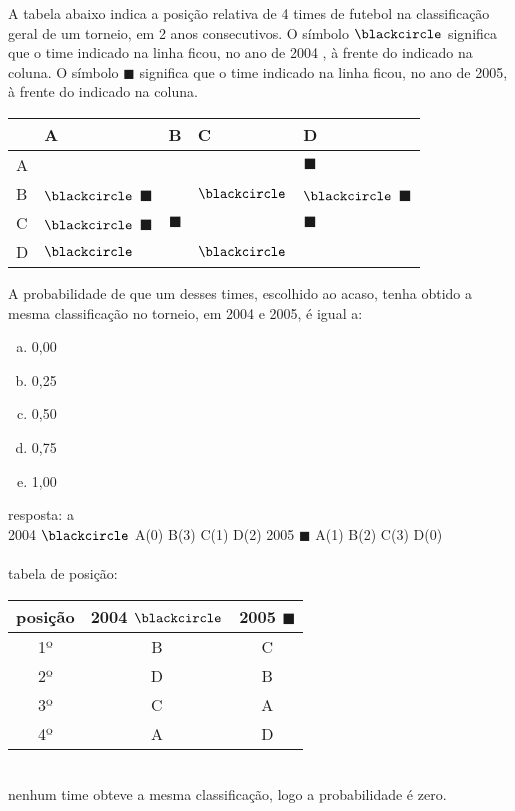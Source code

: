 \begin{ex}
A tabela abaixo indica a posição relativa de 4 times de futebol na classificação geral de um torneio, em 2 anos consecutivos. O símbolo $ \blackcircle$ significa que o time indicado na linha ficou, no ano de 2004 , à frente do indicado na coluna. O símbolo $ \blacksquare$ significa que o time indicado na linha ficou,  no ano de 2005, à frente  do indicado na coluna.
\begin{center}
\renewcommand{\arraystretch}{2} %
\begin{tabular}{|C{2cm}|C{2cm}|C{2cm}|C{2cm}|C{2cm}|}  \hline
&     A      &      B      &      C     &       D   \\ \hline     
A       &            &             &            &  $ \blacksquare $\\ \hline
B       & $\blackcircle $   $\blacksquare$ &   & $\blackcircle$ &  $\blackcircle$  $\blacksquare$\\ \hline
C  & $\blackcircle$    $\blacksquare$  & $\blacksquare$  &    &  $\blacksquare$  \\ \hline
D  & $\blackcircle$  &     &  $\blackcircle$ &      \\  
\hline
\end{tabular}
\end{center}
A probabilidade de que um desses times, escolhido ao acaso, tenha obtido a mesma classificação no torneio, em 2004 e 2005,  é igual a:
   \begin{enumerate}[(a)]
   \item 0,00
   \item 0,25
   \item 0,50
   \item 0,75
   \item 1,00
   \end{enumerate}
     \begin{sol}
      resposta: a \\
      2004 $\blackcircle$  A(0)  B(3)  C(1)  D(2) \hspace{0,8cm} 
      2005 $\blacksquare$  A(1)  B(2)  C(3)  D(0) \\ \\
      tabela de posição:
      \begin{tabular}{|c|c|c|} \hline
      posição &2004 $\blackcircle$&2005 $\blacksquare$  \\ \hline
        1º  & B & C  \\  \hline
        2º  & D & B \\ \hline
        3º  & C & A \\  \hline
        4º  & A & D \\  \hline
      \end{tabular}
      \\
      nenhum time
      obteve a mesma classificação, logo a probabilidade é zero.
     
     \end{sol}
\end{ex}